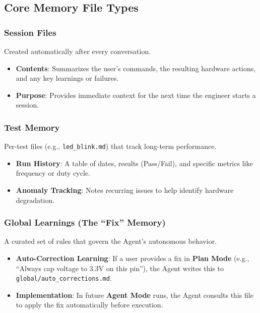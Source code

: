 \documentclass[conference]{IEEEtran}
\begin{document}
\subsection{Core Memory File Types}
\subsubsection{Session Files}
Created automatically after every conversation.
\begin{itemize}
    \item \textbf{Contents}: Summarizes the user's commands, the resulting hardware actions, and any key learnings or failures.
    \item \textbf{Purpose}: Provides immediate context for the next time the engineer starts a session.
\end{itemize}
\subsubsection{Test Memory}
Per-test files (e.g., \texttt{led\_blink.md}) that track long-term performance.
\begin{itemize}
    \item \textbf{Run History}: A table of dates, results (Pass/Fail), and specific metrics like frequency or duty cycle.
    \item \textbf{Anomaly Tracking}: Notes recurring issues to help identify hardware degradation.
\end{itemize}
\subsubsection{Global Learnings (The ``Fix'' Memory)}
A curated set of rules that govern the Agent's autonomous behavior.
\begin{itemize}
    \item \textbf{Auto-Correction Learning}: If a user provides a fix in \textbf{Plan Mode} (e.g., ``Always cap voltage to 3.3V on this pin''), the Agent writes this to \texttt{global/auto\_corrections.md}.
    \item \textbf{Implementation}: In future \textbf{Agent Mode} runs, the Agent consults this file to apply the fix automatically before execution.
\end{itemize}
\end{document}
